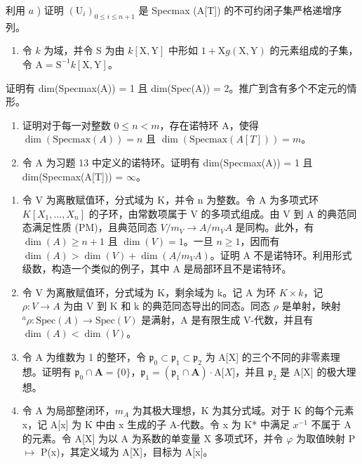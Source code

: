 利用 \(a\) ) 证明 \((\mathrm{U}_i)_{0 \leqslant i \leqslant n+1}\) 是 Specmax (A{[}T{]}) 的不可约闭子集严格递增序列。

\begin{enumerate}
\def\labelenumi{\alph{enumi})}
\setcounter{enumi}{2}
\tightlist
\item
  令 \(k\) 为域，并令 S 为由 \(k[\mathrm{X}, \mathrm{Y}]\) 中形如 \(1 + \mathrm{X}g(\mathrm{X}, \mathrm{Y})\) 的元素组成的子集，令 \(\mathrm{A} = \mathrm{S}^{-1}k[\mathrm{X}, \mathrm{Y}]\)。
\end{enumerate}

证明有 dim(Specmax(A)) = 1 且 dim(Spec(A)) = 2。推广到含有多个不定元的情形。

\begin{enumerate}
\def\labelenumi{\alph{enumi})}
\setcounter{enumi}{3}
\item
  证明对于每一对整数 \(0 \leqslant n < m\)，存在诺特环 A，使得 \(\dim(\text{Specmax}(A)) = n\) 且 \(\dim(\text{Specmax}(A[T])) = m\)。
\item
  令 A 为习题 13 中定义的诺特环。证明有 dim(Specmax(A)) = 1 且 dim(Specmax(A{[}T{]})) = \(\infty\)。
\end{enumerate}


\begin{enumerate}
\def\labelenumi{\arabic{enumi})}
\item
  令 V 为离散赋值环，分式域为 K，并令 n 为整数。令 A 为多项式环 \(K[X_{1},...,X_{n}]\) 的子环，由常数项属于 V 的多项式组成。由 V 到 A 的典范同态满足性质 (PM)，且典范同态 \(V/m_{V} \rightarrow A/m_{V}A\) 是同构。此外，有 \(\dim(A) \geqslant n + 1\) 且 \(\dim(V) = 1\)。一旦 \(n \geqslant 1\)，因而有 \(\dim(A) > \dim(V) + \dim(A/m_{V}A)\)。证明 A 不是诺特环。利用形式级数，构造一个类似的例子，其中 A 是局部环且不是诺特环。
\item
  令 V 为离散赋值环，分式域为 K，剩余域为 k。记 A 为环 \(K \times k\)，记 \(\rho : V \to A\) 为由 V 到 K 和 k 的典范同态导出的同态。同态 \(\rho\) 是单射，映射 \(^{a}\rho : \text{Spec}(A) \to \text{Spec}(V)\) 是满射，A 是有限生成 V-代数，并且有 \(\dim(A) < \dim(V)\)。
\item
  令 A 为维数为 1 的整环，令 \(\mathfrak{p}_0 \subset \mathfrak{p}_1 \subset \mathfrak{p}_2\) 为 A{[}X{]} 的三个不同的非零素理想。证明有 \(\mathfrak{p}_0 \cap \mathbf{A} = \{0\}\)，\(\mathfrak{p}_1 = (\mathfrak{p}_1 \cap \mathbf{A})\cdot\mathrm{A}{[}X{]}\)，并且 \(\mathfrak{p}_2\) 是 A{[}X{]} 的极大理想。
\item
  令 A 为局部整闭环，\(m_A\) 为其极大理想，K 为其分式域。对于 K 的每个元素 x，记 A{[}x{]} 为 K 中由 x 生成的子 A-代数。令 x 为 K* 中满足 \(x^{-1}\) 不属于 A 的元素。令 A{[}X{]} 为以 A 为系数的单变量 X 多项式环，并令 \(\varphi\) 为取值映射 P \(\mapsto\) P(x)，其定义域为 A{[}X{]}，目标为 A{[}x{]}。
\end{enumerate}

